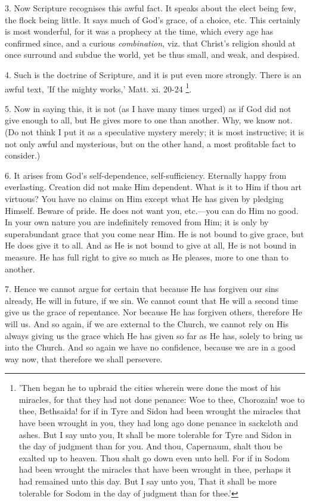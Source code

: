 3. Now Scripture recognises this awful fact. It
speaks about the elect being few, the flock being little. It says much
of God's grace, of a choice, etc. This certainly is most wonderful,
for it was a prophecy at the time, which every age has confirmed since, and a curious \emph{combination}, viz. that Christ's religion
should at once surround and subdue the world, yet be thus small, and
weak, and despised.

4. Such is the doctrine of Scripture, and it is
put even more strongly. There is an awful text, 'If the mighty works,'
Matt. xi. 20-24 \footnote{'Then began he to upbraid
the cities wherein were done the most of his miracles, for that they
had not done penance: Woe to thee, Chorozain! woe to thee, Bethsaida!
for if in Tyre and Sidon had been wrought the miracles that have been
wrought in you, they had long ago done penance in sackcloth and ashes.
But I say unto you, It shall be more tolerable for Tyre and Sidon in
the day of judgment than for you. And thou, Capernaum, shalt thou be
exalted up to heaven. Thou shalt go down even unto hell. For if in
Sodom had been wrought the miracles that have been wrought in thee,
perhaps it had remained unto this day. But I say unto you, That it
shall be more tolerable for Sodom in the day of judgment than for
thee.'}.

5. Now in saying this, it is not (as I have many
times urged) as if God did not give enough to all, but He gives more
to one than another. Why, we know not. (Do not think I put it as a
speculative mystery merely; it is most instructive; it is not only
awful and mysterious, but on the other hand, a most profitable fact to
consider.)

6. It arises from God's self-dependence,
self-sufficiency. Eternally happy from everlasting. Creation did not
make Him dependent. What is it to Him if thou art virtuous? You have
no claims on Him except what He has given by pledging Himself. Beware
of pride. He does not want you, etc.—you can do Him no good. In your
own nature you are indefinitely removed from Him; it is only by
superabundant grace that you come near Him. He is not bound to
give grace, but He does give it to all. And as He is not bound to give
at all, He is not bound in measure. He has full right to give so much
as He pleases, more to one than to another.

7. Hence we cannot argue for certain that because
He has forgiven our sins already, He will in future, if we sin. We
cannot count that He will a second time give us the grace of
repentance. Nor because He has forgiven others, therefore He will us.
And so again, if we are external to the Church, we cannot rely on His
always giving us the grace which He has given so far as He has, solely
to bring us into the Church. And so again we have no confidence,
because we are in a good way now, that therefore we shall persevere.

